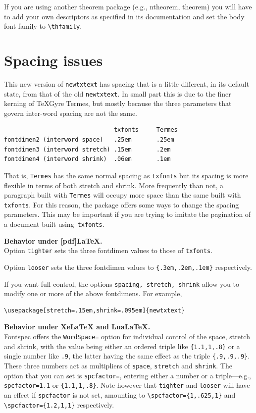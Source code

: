 \documentclass[\fsc]{article}
\theoremstyle{oldplain}
\theoremstyle{plain}
\begin{document}
If you are using another theorem package (e.g., ntheorem, theorem) you will have to add your own descriptors as specified in its documentation and set the body font family to \verb|\thfamily|.

\section{Spacing issues}
This new version of {\tt newtxtext} has spacing that is a little different, in its default state, from that of the old {\tt newtxtext}. In small part this is due to the finer kerning of TeXGyre Termes, but mostly because the three parameters that govern inter-word spacing are not the same.
\begin{verbatim}
                               txfonts     Termes
fontdimen2 (interword space)   .25em       .25em
fontdimen3 (interword stretch) .15em       .2em
fontdimen4 (interword shrink)  .06em       .1em
\end{verbatim}
That is, {\tt Termes} has the same normal spacing as {\tt txfonts} but its spacing is more flexible in terms of both stretch and shrink. More frequently than not, a paragraph built with {\tt Termes} will occupy more space than the same built with {\tt txfonts}. For this reason, the package offers some ways to change the spacing parameters. This may be important if you are trying to imitate the pagination of a document built using~{\tt txfonts}.

\textbf{Behavior under [pdf]LaTeX.}\\
Option {\tt tighter} sets the three fontdimen values to those of {\tt txfonts}.  

Option {\tt looser} sets the three fontdimen values to \verb|{.3em,.2em,.1em}| respectively. 

If you want full control, the options {\tt spacing, stretch, shrink} allow you to modify one or more of the above fontdimens. For example,
\begin{verbatim}
\usepackage[stretch=.15em,shrink=.095em]{newtxtext}
\end{verbatim}

\textbf{Behavior under XeLaTeX and LuaLaTeX.}\\
Fontspec  offers the {\tt WordSpace=} option for individual control of the space, stretch and shrink, with the value being either an ordered triple like \verb|{1.1,1,.8}| or a single number like {\tt .9}, the latter having the same effect as the triple \verb|{.9,.9,.9}|. These three numbers act as multipliers of {\tt space}, {\tt stretch} and {\tt shrink}. The option that you can set is {\tt spcfactor=}, entering either a number or a triple---e.g., {\tt spcfactor=1.1} or \verb|{1.1,1,.8}|. Note however that {\tt tighter} and {\tt looser} will have an effect if {\tt spcfactor} is not set, amounting to \verb|\spcfactor={1,.625,1}| and \verb|\spcfactor={1.2,1,1}| respectively.
\end{document}
